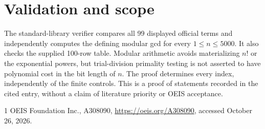 \documentclass[10pt]{article}
\begin{document}
\section{Validation and scope}
The standard-library verifier compares all 99 displayed official terms and independently computes the defining modular gcd for every $1\le n\le5000$. It also checks the supplied 100-row table. Modular arithmetic avoids materializing $n!$ or the exponential powers, but trial-division primality testing is not asserted to have polynomial cost in the bit length of $n$. The proof determines every index, independently of the finite controls. This is a proof of statements recorded in the cited entry, without a claim of literature priority or OEIS acceptance.
\begin{thebibliography}{1}
 OEIS Foundation Inc., A308090, \url{https://oeis.org/A308090}, accessed October 26, 2026.
\end{thebibliography}
\end{document}
